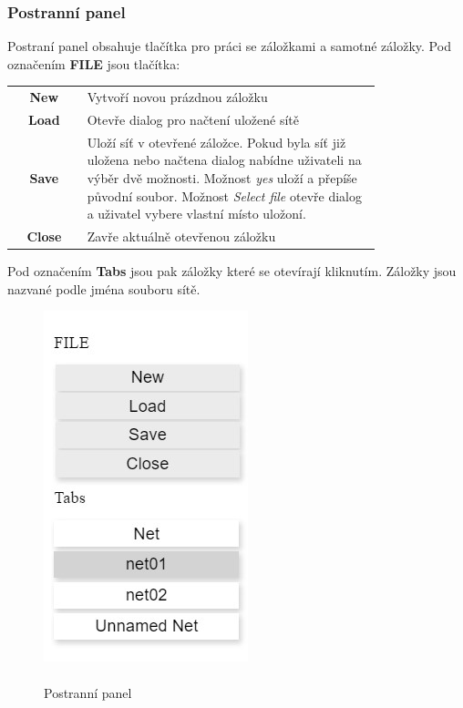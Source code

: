 \documentclass[
  biblatex,
  glossaries,
  index
]{kidiplom}
\begin{document}
\subsubsection{Postranní panel}\label{panel}

Postraní panel obsahuje tlačítka pro práci se záložkami a 
samotné záložky. Pod označením \textbf{FILE} jsou tlačítka:
\begin{center}
  \begin{tabular}{c p{0.8\linewidth}}
    \textbf{New}    & Vytvoří novou prázdnou záložku \\
    \textbf{Load}   & Otevře dialog pro načtení uložené sítě \\
    \textbf{Save}   & Uloží síť v otevřené záložce. Pokud byla síť již uložena 
      nebo načtena dialog nabídne uživateli na výběr dvě možnosti.
      Možnost \textit{yes} uloží a přepíše původní soubor.
      Možnost \textit{Select file} otevře dialog 
      a uživatel vybere vlastní místo uložoní. \\
    \textbf{Close}  & Zavře aktuálně otevřenou záložku \\
  \end{tabular}
\end{center}

Pod označením \textbf{Tabs} jsou pak záložky které se otevírají kliknutím.
Záložky jsou nazvané podle jména souboru sítě.

\begin{figure}[h]
  \centering
  \includegraphics{editor_panel}
  \caption{\\Postranní panel}\label{fig:Postranní panel}
\end{figure}
\end{document}
